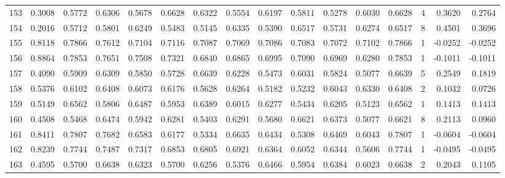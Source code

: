 \begin{tabular}{lrrrrrrrrrrrrrrr}
153 &      0.3008 &  0.5772 &  0.6306 &  0.5678 &  0.6628 &  0.6322 &  0.5554 &  0.6197 &  0.5811 &  0.5278 &   0.6030 &     0.6628 &      4 &                    0.3620 &                     0.2764 \\
154 &      0.2016 &  0.5712 &  0.5801 &  0.6249 &  0.5483 &  0.5145 &  0.6335 &  0.5390 &  0.6517 &  0.5731 &   0.6274 &     0.6517 &      8 &                    0.4501 &                     0.3696 \\
155 &      0.8118 &  0.7866 &  0.7612 &  0.7104 &  0.7116 &  0.7087 &  0.7069 &  0.7086 &  0.7083 &  0.7072 &   0.7102 &     0.7866 &      1 &                   -0.0252 &                    -0.0252 \\
156 &      0.8864 &  0.7853 &  0.7651 &  0.7508 &  0.7321 &  0.6840 &  0.6865 &  0.6995 &  0.7090 &  0.6969 &   0.6280 &     0.7853 &      1 &                   -0.1011 &                    -0.1011 \\
157 &      0.4090 &  0.5909 &  0.6309 &  0.5850 &  0.5728 &  0.6639 &  0.6228 &  0.5473 &  0.6031 &  0.5824 &   0.5077 &     0.6639 &      5 &                    0.2549 &                     0.1819 \\
158 &      0.5376 &  0.6102 &  0.6408 &  0.6073 &  0.6176 &  0.5628 &  0.6264 &  0.5182 &  0.5232 &  0.6043 &   0.6330 &     0.6408 &      2 &                    0.1032 &                     0.0726 \\
159 &      0.5149 &  0.6562 &  0.5806 &  0.6487 &  0.5953 &  0.6389 &  0.6015 &  0.6277 &  0.5434 &  0.6205 &   0.5123 &     0.6562 &      1 &                    0.1413 &                     0.1413 \\
160 &      0.4508 &  0.5468 &  0.6474 &  0.5942 &  0.6281 &  0.5403 &  0.6291 &  0.5680 &  0.6621 &  0.6373 &   0.5077 &     0.6621 &      8 &                    0.2113 &                     0.0960 \\
161 &      0.8411 &  0.7807 &  0.7682 &  0.6583 &  0.6177 &  0.5334 &  0.6635 &  0.6434 &  0.5308 &  0.6469 &   0.6043 &     0.7807 &      1 &                   -0.0604 &                    -0.0604 \\
162 &      0.8239 &  0.7744 &  0.7487 &  0.7317 &  0.6853 &  0.6805 &  0.6921 &  0.6364 &  0.6052 &  0.6344 &   0.5606 &     0.7744 &      1 &                   -0.0495 &                    -0.0495 \\
163 &      0.4595 &  0.5700 &  0.6638 &  0.6323 &  0.5700 &  0.6256 &  0.5376 &  0.6466 &  0.5954 &  0.6384 &   0.6023 &     0.6638 &      2 &                    0.2043 &                     0.1105 \\

\end{tabular}
